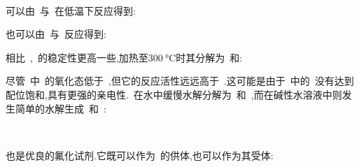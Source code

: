 \documentclass{ctexbook}
\begin{document}
\paragraph{}
可以由~与~在低温下反应得到:
\begin{tightcenter}
\end{tightcenter}
也可以由~与~反应得到:
\begin{tightcenter}
\end{tightcenter}
相比~,~的稳定性更高一些,加热至$\SI{300}{\celsius}$时其分解为~和:
\begin{tightcenter}
\end{tightcenter}
尽管~中~的氧化态低于~,但它的反应活性远远高于~.这可能是由于~中的~没有达到配位饱和,具有更强的亲电性.~在水中缓慢水解分解为~和~,而在碱性水溶液中则发生简单的水解生成~和~:
\begin{tightcenter}
    \\
\end{tightcenter}
\indent {}也是优良的氟化试剂.它既可以作为~的供体,也可以作为其受体:
\begin{tightcenter}
    \\
\end{tightcenter}
\end{document}
